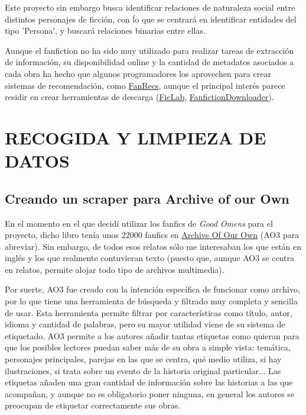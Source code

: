\documentclass{pre-tfg}
\begin{document}
Este proyecto sin embargo busca identificar relaciones de naturaleza social entre distintos personajes de ficción, con ĺo que se centrará en identificar entidades del tipo 'Persona', y buscará relaciones binarias entre ellas. 

Aunque el fanfiction no ha sido muy utilizado para realizar tareas de extracción de información, su disponibilidad online y la cantidad de metadatos asociados a cada obra ha hecho que algunos programadores los aprovechen para crear sistemas de recomendación, como \href{http://fanrecs.com/}{FanRecs}, aunque el principal interés parece residir en crear herramientas de descarga  (\href{https://www.ficlab.com/}{FicLab}, \href{https://fanfictiondownloader.net/#/home}{FanfictionDownloader}).



\cleardoublepage
\section{RECOGIDA Y LIMPIEZA DE DATOS}

\subsection{Creando un scraper para Archive of our Own}
\label{sec:recogidadatos}

En el momento en el que decidí utilizar los fanfics de \textit{Good Omens} para el proyecto, dicho libro tenía unos 22000 fanfics en \href{archiveofourown.org}{Archive Of Our Own} (AO3 para abreviar). Sin embargo, de todos esos relatos sólo me interesaban los que están en inglés y los que realmente contuvieran texto (puesto que, aunque AO3 se centra en relatos, permite alojar todo tipo de archivos multimedia).

Por suerte, AO3 fue creado con la intención específica de funcionar como archivo, por lo que tiene una herramienta de búsqueda y filtrado muy completa y sencilla de usar. Esta herramienta permite filtrar por características como título, autor, idioma y cantidad de palabras, pero su mayor utilidad viene de su sistema de etiquetado. AO3 permite a los autores añadir tantas etiquetas como quieran para que los posibles lectores puedan saber más de su obra a simple vista: temática, personajes principales, parejas en las que se centra, qué medio utiliza, si hay ilustraciones, si trata sobre un evento de la historia original particular... Las etiquetas añaden una gran cantidad de información sobre las historias a las que acompañan, y aunque no es obligatorio poner ninguna, en general los autores se preocupan de etiquetar correctamente sus obras.
\end{document}
